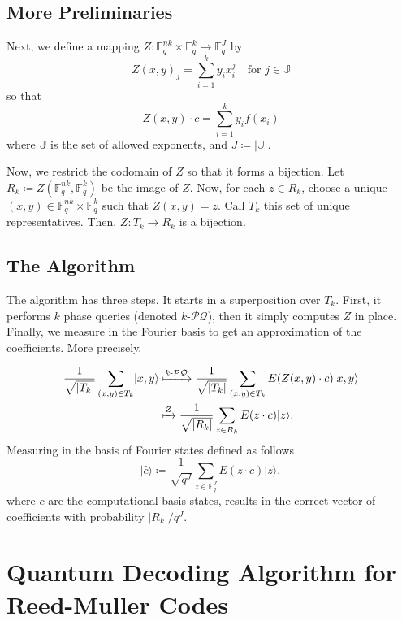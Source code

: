 \documentclass[12pt,twoside]{reedthesis}
\theoremstyle{definition}
\newcommand{\F}{\mathbb{F}}
\newcommand{\ket}[1]{\ensuremath{\lvert #1\rangle}\xspace}
\begin{document}
\section{More Preliminaries}
Next, we define a mapping $Z: \F_q^{nk} \times \F_q^{k} \rightarrow \F_q^{J}$ by 
\begin{equation*}
Z(x,y)_j = \sum_{i = 1}^k y_ix_i^j \quad \text{for }j \in \mathbb{J}
\end{equation*}
so that
\begin{equation*}
Z(x,y) \cdot c = \sum_{i=1}^k y_i f(x_i)
\end{equation*}
where $\mathbb{J}$ is the set of allowed exponents, and $J \coloneqq \lvert \mathbb{J} \rvert$.

Now, we restrict the codomain of $Z$ so that it forms a bijection. Let $R_k \coloneqq Z(\F_q^{nk}, \F_q^k)$ be the image of $Z$. Now, for each $z \in R_k$, choose a unique $(x,y) \in \F_q^{nk} \times \F_q^{k}$ such that $Z(x,y) = z$. Call $T_k$ this set of unique representatives. Then, $Z: T_k \rightarrow R_k$ is a bijection.

\section{The Algorithm}
The algorithm has three steps. It starts in a superposition over $T_k$. First, it performs $k$ phase queries (denoted $k$-$\mathcal{PQ}$), then it simply computes $Z$ in place. Finally, we measure in the Fourier basis to get an approximation of the coefficients. More precisely,

\begin{align*}
\frac{1}{\sqrt{\lvert T_k \rvert}} \sum_{(x,y)\in T_k} \ket{x,y} 
& \xmapsto{k\text{-}\mathcal{PQ}} \frac{1}{\sqrt{\lvert T_k \rvert}} \sum_{(x,y)\in T_k} E(Z(x,y) \cdot c) \ket{x,y} \\
& \xmapsto{Z} \frac{1}{\sqrt{\lvert R_k \rvert}} \sum_{z\in R_k} E(z \cdot c) \ket{z}. 
\end{align*}
Measuring in the basis of Fourier states defined as follows
\begin{equation*}
\ket{\hat{c}} \coloneqq \frac{1}{\sqrt{q^J}} \sum_{z \in \F_q^J} E(z \cdot c) \ket{z},
\end{equation*}
where $c$ are the computational basis states, results in the correct vector of coefficients with probability $\lvert R_k \rvert / q^J$.


\chapter{Quantum Decoding Algorithm for Reed-Muller Codes}
\end{document}
